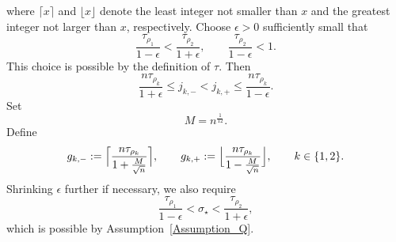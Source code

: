 \documentclass[a4paper]{article}
\numberwithin{equation}{section}
\begin{document}
where $\lceil x\rceil$ and $\lfloor x\rfloor$ denote the least integer not smaller than $x$ and the greatest integer not larger than $x$, respectively.
Choose $\epsilon>0$ sufficiently small that
\begin{equation}
\label{def of tau k ast epsilon inequality}
    \frac{\tau_{\rho_1}}{1-\epsilon}<\frac{\tau_{\rho_2}}{1+\epsilon},\qquad \frac{\tau_{\rho_2}}{1-\epsilon}<1. 
\end{equation}
This choice is possible by the definition of $\tau$.
Then
\[
\frac{n\tau_{\rho_k}}{1+\epsilon}\leq j_{k,-}<j_{k,+}\leq \frac{n\tau_{\rho_k}}{1-\epsilon}. 
\]
Set
\begin{equation}
\label{def of M parameter}
M=n^{\frac{1}{12}}.
\end{equation}
Define
\begin{equation}
g_{k,-}:=\Bigl\lceil \frac{n\tau_{\rho_k}}{1+\frac{M}{\sqrt{n}}} \Bigr\rceil, \qquad 
g_{k,+}:=\Bigl\lfloor \frac{n\tau_{\rho_k}}{1-\frac{M}{\sqrt{n}}}\Bigr\rfloor,\qquad k\in\{1,2\}. 
\end{equation}
Shrinking $\epsilon$ further if necessary, we also require
\begin{equation}
\label{def of sigma ast interrelashion epsilon}
\frac{\tau_{\rho_1}}{1-\epsilon}<\sigma_{\star}<\frac{\tau_{\rho_2}}{1+\epsilon},
\end{equation}
which is possible by Assumption~\ref{Assumption_Q}.

\end{document}
